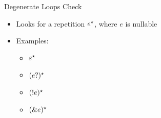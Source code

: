 \documentclass{beamer}
\begin{document}
\begin{frame}{Degenerate Loops Check}
    \begin{itemize}
        \item Looks for a repetition $e^\star$, where $e$ is nullable
    \end{itemize}
    \begin{itemize}
        \item Examples:
        \begin{itemize}
            \item $\varepsilon^\star$
            \item $(e?)^\star$
            \item $(!e)^\star$
            \item $(\&e)^\star$
        \end{itemize}
    \end{itemize}
\end{frame}
\end{document}
